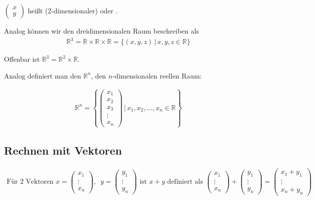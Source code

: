 $\begin{pmatrix}x \\ y\end{pmatrix}$ heißt (2-dimensionaler)  oder .

Analog können wir den dreidimensionalen Raum beschreiben als
\begin{align*}
	\mathbb{R}^3 = \mathbb{R} \times \mathbb{R} \times \mathbb{R} = \{(x,y,z)\,|\,x,y,z \in \mathbb{R}\}
\end{align*}

Offenbar ist $\mathbb{R}^3 = \mathbb{R}^2 \times \mathbb{R}$.

Analog definiert man den $\mathbb{R}^n$, den $n$-dimensionalen reellen Raum:

\begin{align*}
	\mathbb{R}^n = \left\{\begin{pmatrix}x_1 \\ x_2 \\ x_3 \\ \vdots \\ x_n \end{pmatrix}\,\Bigg|\, x_1, x_2, \dots, x_n \in \mathbb{R} \right\}
\end{align*}

\subsection{Rechnen mit Vektoren}
\begin{align*}
	\text{Für 2 Vektoren }x = \begin{pmatrix}x_1 \\ \vdots \\ x_n \end{pmatrix},\enspace y = \begin{pmatrix}y_1 \\ \vdots \\ y_n \end{pmatrix}\text{ ist } x + y\text{ definiert als }\begin{pmatrix}x_1 \\ \vdots \\ x_n \end{pmatrix} + \begin{pmatrix}y_1 \\ \vdots \\ y_n \end{pmatrix} = \begin{pmatrix}x_1 + y_1 \\ \vdots \\ x_n + y_n \end{pmatrix}
\end{align*}

